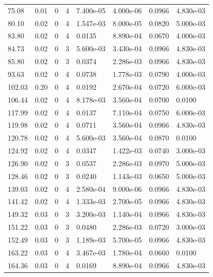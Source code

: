 \documentclass[preview]{standalone}
\begin{document}
{{\begin{tabular}{L{1.2cm}C{1.2cm} C{0.3cm}C{0.5cm} C{1.4cm}C{1.4cm} C{1.4cm}C{1.4cm}}
  75.08  &  0.01  & 0     &  4 &  7.400e-05  & 4.000e-06  & 0.0966 &  4.830e-03   \\ 
  80.10  &  0.02  & 0     &  4 &  1.547e-03  & 8.000e-05  & 0.0820 &  5.000e-03   \\ 
  83.80  &  0.02  & 0     &  4 &  0.0135  & 8.890e-04  & 0.0670 &  4.000e-03   \\ 
  84.73  &  0.02  & 0     &  3 &  5.600e-03  & 3.430e-04  & 0.0966 &  4.830e-03   \\ 
  85.80  &  0.02  & 0     &  3 &  0.0374  & 2.286e-03  & 0.0966 &  4.830e-03   \\ 
  93.63  &  0.02  & 0     &  4 &  0.0738  & 1.778e-03  & 0.0790 &  4.000e-03   \\ 
  102.03  &  0.20  & 0     &  4 &  0.0192  & 2.670e-04  & 0.0720 &  6.000e-03   \\ 
  106.44  &  0.02  & 0     &  4 &  8.178e-03  & 3.560e-04  & 0.0700 &  0.0100   \\ 
  117.99  &  0.02  & 0     &  4 &  0.0137  & 7.110e-04  & 0.0750 &  6.000e-03   \\ 
  119.98  &  0.02  & 0     &  4 &  0.0711  & 3.560e-04  & 0.0966 &  4.830e-03   \\ 
  120.78  &  0.02  & 0     &  4 &  5.600e-03  & 3.560e-04  & 0.0870 &  0.0100   \\ 
  124.92  &  0.02  & 0     &  4 &  0.0347  & 1.422e-03  & 0.0740 &  3.000e-03   \\ 
  126.90  &  0.02  & 0     &  3 &  0.0537  & 2.286e-03  & 0.0970 &  5.000e-03   \\ 
  128.46  &  0.02  & 0     &  3 &  0.0240  & 1.143e-03  & 0.0650 &  5.000e-03   \\ 
  139.03  &  0.02  & 0     &  4 &  2.580e-04  & 9.000e-06  & 0.0966 &  4.830e-03   \\ 
  141.42  &  0.02  & 0     &  4 &  1.333e-03  & 2.700e-05  & 0.0966 &  4.830e-03   \\ 
  149.32  &  0.03  & 0     &  3 &  3.200e-03  & 1.140e-04  & 0.0966 &  4.830e-03   \\ 
  151.22  &  0.03  & 0     &  3 &  0.0480  & 2.286e-03  & 0.0720 &  3.000e-03   \\ 
  152.49  &  0.03  & 0     &  3 &  1.189e-03  & 5.700e-05  & 0.0966 &  4.830e-03   \\ 
  163.22  &  0.03  & 0     &  4 &  3.467e-03  & 1.780e-04  & 0.0660 &  0.0100   \\ 
  164.36  &  0.03  & 0     &  4 &  0.0169  & 8.890e-04  & 0.0966 &  4.830e-03   \\ 

\end{tabular}}}
\end{document}
